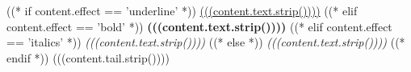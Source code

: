 ((* if content.effect == 'underline' *))
 \uline{(((content.text.strip())))} 
((* elif content.effect == 'bold' *))
 \textbf{(((content.text.strip())))} 
((* elif content.effect == 'italics' *))
 \textit{(((content.text.strip())))} 
((* else *))
 \emph{(((content.text.strip())))} 
((* endif *)) (((content.tail.strip())))
